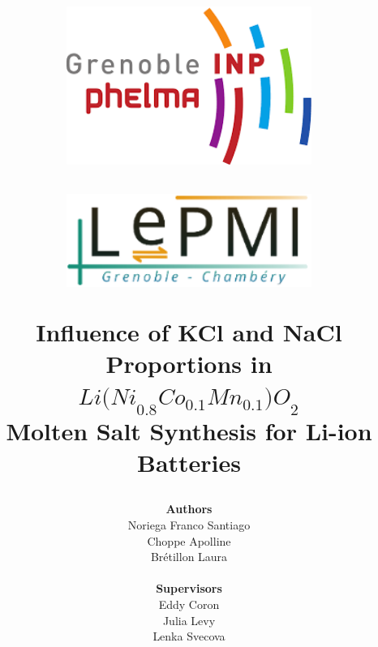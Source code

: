 \documentclass{article}
\begin{document}
\title{
  \vspace{-3cm}  %
  \begin{minipage}{0.48\textwidth}
     \raggedright  %
    \includegraphics[width=0.6\textwidth]{images.png}  %
   \vspace{2cm}
  \end{minipage}
  \begin{minipage}{0.48\textwidth}
    \raggedleft
 
    \includegraphics[width=0.6\textwidth]{lepmi_logo.png}
    \vspace{2cm}
  \end{minipage}
  \vspace{2cm}

  \textbf{\Large Influence of KCl and NaCl Proportions in\\
  ${Li(Ni}_{0.8}{Co}_{0.1}{Mn}_{0.1}{)O}_{2}$ }\\ 
  \vspace{0.3cm}
  \textbf{\Large Molten Salt Synthesis for Li-ion Batteries}
    \vspace{4cm}
  }
 

\author{
  \textbf{Authors}\\
  Noriega Franco Santiago \\
  Choppe Apolline \\
  Brétillon Laura\\
  \\
  \textbf{Supervisors}\\
  Eddy Coron\\
  Julia Levy\\
  Lenka Svecova}
\end{document}
